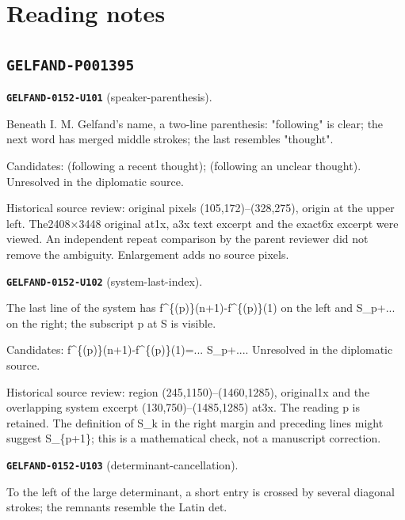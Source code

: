 \section*{Reading notes}
\subsection*{\texttt{GELFAND-P001395}}
\par\noindent\leavevmode{}\label{GELFAND-0152-U101}\textbf{\texttt{GELFAND-0152-U101}} (speaker-parenthesis).\nopagebreak[4]\par
Beneath I. M. Gelfand's name, a two-line parenthesis: "following" is clear; the next word has merged middle strokes; the last resembles "thought".\par
Candidates: (following a recent thought); (following an unclear thought). Unresolved in the diplomatic source.\par
Historical source review: original pixels (105,172)–(328,275), origin at the upper left. The2408×3448 original at1x, a3x text excerpt and the exact6x excerpt were viewed. An independent repeat comparison by the parent reviewer did not remove the ambiguity. Enlargement adds no source pixels.\par\medskip
\par\noindent\leavevmode{}\label{GELFAND-0152-U102}\textbf{\texttt{GELFAND-0152-U102}} (system-last-index).\nopagebreak[4]\par
The last line of the system has f\textasciicircum{}\{(p)\}(n+1)-f\textasciicircum{}\{(p)\}(1) on the left and S\_p+... on the right; the subscript p at S is visible.\par
Candidates: f\textasciicircum{}\{(p)\}(n+1)-f\textasciicircum{}\{(p)\}(1)=... S\_p+.... Unresolved in the diplomatic source.\par
Historical source review: region (245,1150)–(1460,1285), original1x and the overlapping system excerpt (130,750)–(1485,1285) at3x. The reading p is retained. The definition of S\_k in the right margin and preceding lines might suggest S\_\{p+1\}; this is a mathematical check, not a manuscript correction.\par\medskip
\par\noindent\leavevmode{}\label{GELFAND-0152-U103}\textbf{\texttt{GELFAND-0152-U103}} (determinant-cancellation).\nopagebreak[4]\par
To the left of the large determinant, a short entry is crossed by several diagonal strokes; the remnants resemble the Latin det.\par
